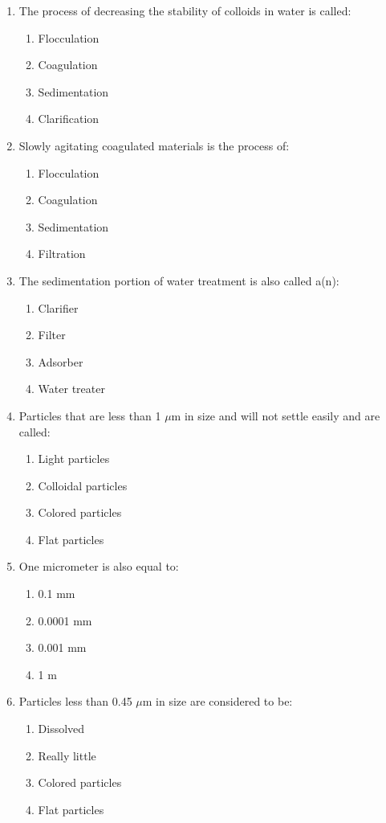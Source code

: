 \documentclass{article}
\begin{document}
\begin{enumerate}
\item The process of decreasing the stability of colloids in water is called:
\begin{enumerate}
\item Flocculation
\item Coagulation
\item Sedimentation
\item Clarification
\end{enumerate}

\item Slowly agitating coagulated materials is the process of:
\begin{enumerate}
\item Flocculation
\item Coagulation
\item Sedimentation
\item Filtration
\end{enumerate}

\item The sedimentation portion of water treatment is also called a(n):
\begin{enumerate}
\item Clarifier
\item Filter
\item Adsorber
\item Water treater
\end{enumerate}

\item Particles that are less than 1 $\mu\text{m}$ in size and will not settle easily and are called:
\begin{enumerate}
\item Light particles
\item Colloidal particles
\item Colored particles
\item Flat particles
\end{enumerate}

\item One micrometer is also equal to:
\begin{enumerate}
\item 0.1 mm
\item 0.0001 mm
\item 0.001 mm
\item 1 m
\end{enumerate}

\item Particles less than 0.45 $\mu\text{m}$ in size are considered to be:
\begin{enumerate}
\item Dissolved
\item Really little
\item Colored particles
\item Flat particles
\end{enumerate}


\end{enumerate}
\end{document}
